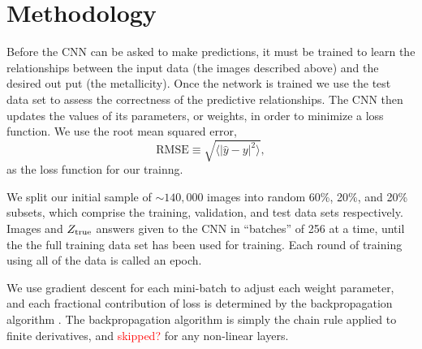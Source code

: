 \documentclass[fleqn,usenatbib]{mnras}
\newcommand{\editorial}[1]{\textcolor{red}{#1}}
\begin{document}
\section{Methodology}\label{sec:training}
Before the CNN can be asked to make predictions, it must be trained to learn the relationships between the input data (the images described above) and the desired out put (the metallicity). Once the network is trained we use the test data set to assess the correctness of the predictive relationships. The CNN then updates the values of its parameters, or weights, in order to minimize a loss function. We use the root mean squared error,
\begin{equation}
\mathrm{RMSE} \equiv \sqrt{\langle |\hat y - y|^2\rangle},
\end{equation}
as the loss function for our trainng.

We split our initial sample of $\sim 140,000$ images into random 60\%, 20\%, and 20\% subsets, which comprise the training, validation, and test data sets respectively. Images and $Z_{\rm true}$ answers given to the CNN in ``batches'' of 256 at a time, until the the full training data set has been used for training. Each round of training using all of the data is called an epoch.


We use gradient descent for each mini-batch to adjust each weight parameter, and each fractional contribution of loss is determined by the backpropagation algorithm \citep{LeCun1989}. The backpropagation algorithm is simply the chain rule applied to finite derivatives, and \editorial{skipped?} for any non-linear layers. %
\end{document}
